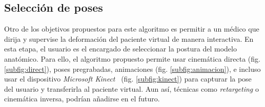 \subsection{Selección de poses}
\label{posing:Poses}
%
Otro de los objetivos propuestos para este algoritmo es permitir a un médico que dirija y supervise la deformación del paciente virtual de manera interactiva. %
En esta etapa, el usuario es el encargado de seleccionar la postura del modelo anatómico. Para ello, el algoritmo propuesto permite usar cinemática directa (fig. \ref{subfig:direct}), poses pregrabadas, animaciones (fig. \ref{subfig:animacion}), e incluso usar el dispositivo \emph{Microsoft Kinect}~\cite{shotton2013} (fig. \ref{subfig:kinect}) para capturar la pose del usuario y transferirla al paciente virtual. Aun así, técnicas como \emph{retargeting} \cite{7581666} o cinemática inversa, podrían añadirse en el futuro. %
